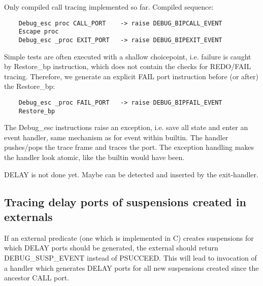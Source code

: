 Only compiled call tracing implemented so far. Compiled sequence:
\begin{verbatim}
	Debug_esc proc CALL_PORT	-> raise DEBUG_BIPCALL_EVENT
	Escape proc
	Debug_esc _proc EXIT_PORT	-> raise DEBUG_BIPEXIT_EVENT
\end{verbatim}
Simple tests are often executed with a shallow choicepoint, i.e. failure
is caught by Restore_bp instruction, which does not contain the checks
for REDO/FAIL tracing. Therefore, we generate an explicit FAIL port
instruction before (or after) the Restore_bp:
\begin{verbatim}
	Debug_esc _proc FAIL_PORT	-> raise DEBUG_BIPFAIL_EVENT
	Restore_bp
\end{verbatim}
The Debug_esc instructions raise an exception, i.e. save all state and
enter an event handler, same mechanism as for event within builtin.
The handler pushes/pops the trace frame and traces the port. The exception
handling makes the handler look atomic, like the builtin would have been.

DELAY is not done yet. Maybe can be detected and inserted by the exit-handler.


\subsection{Tracing delay ports of suspensions created in externals}

If an external predicate (one which is implemented in C) creates suspensions
for which DELAY ports should be generated, the external should return
DEBUG_SUSP_EVENT instead of PSUCCEED. This will lead to invocation of
a handler which generates DELAY ports for all new suspensions created
since the ancestor CALL port.


